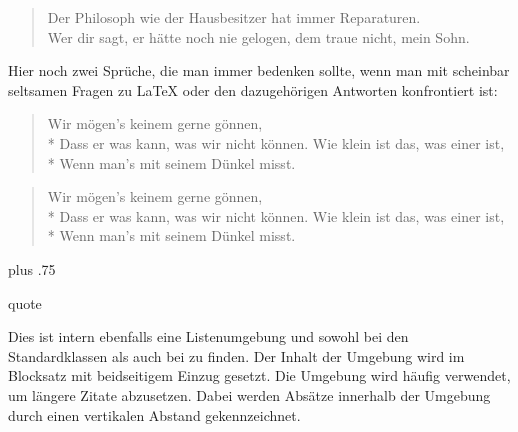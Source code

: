 \begin{Example}
\begin{lstcode}
  \begin{verse}
    Der Philosoph wie der Hausbesitzer
    hat immer Reparaturen.\\
    \bigskip
    Wer dir sagt, er hätte noch nie
    gelogen, dem traue nicht, mein Sohn.
  \end{verse}
\end{lstcode}
      \iftrue%
        Hier noch zwei Sprüche, die man immer bedenken sollte, wenn man mit
        scheinbar seltsamen Fragen zu {\LaTeX} oder den dazugehörigen Antworten
        konfrontiert ist:
\begin{lstcode}
  \begin{verse}
    Wir mögen's keinem gerne gönnen,\\*
    Dass er was kann, was wir nicht können.
    \bigskip
    Wie klein ist das, was einer ist,\\*
    Wenn man's mit seinem Dünkel misst.
  \end{verse}
\end{lstcode}
        \begin{ShowOutput}
          \begin{verse}
            Wir mögen's keinem gerne gönnen,\\*
            Dass er was kann, was wir nicht können.
            \bigskip
            Wie klein ist das, was einer ist,\\*
            Wenn man's mit seinem Dünkel misst.
          \end{verse}
        \end{ShowOutput}
      \fi %
      \iffalse %
        In diesen Beispielen wurde übrigens jeweils \Macro{bigskip} verwendet,
        um zwei Sprüche voneinander zu trennen.%
      \fi %
    \end{Example}%
    \ht\strutbox plus .75\strutbox%
  \fi
  \EndIndexGroup


  \iffalse%
    \begin{Declaration}
      \begin{Environment}{quote}\end{Environment}
    \end{Declaration}%
    Dies ist
    intern ebenfalls eine Listenumgebung und sowohl bei den Standardklassen als auch bei
    {\KOMAScript} zu finden. Der Inhalt der Umgebung wird im Blocksatz mit
    beidseitigem Einzug gesetzt. Die Umgebung wird häufig verwendet, um
    längere Zitate abzusetzen. Dabei werden Absätze innerhalb der
    Umgebung durch einen vertikalen Abstand gekennzeichnet.%
    \EndIndexGroup

